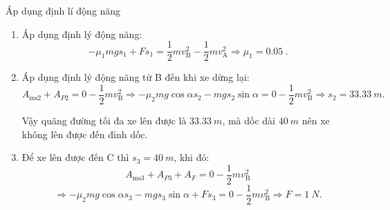 \begin{dang}{Áp dụng định lí động năng}
{		\begin{enumerate}[label=\alph*)]
			\item 
			
			Áp dụng định lý động năng:
			$$-\mu_1 mg s_1 + Fs_1 = \dfrac{1}{2}mv_\text{B}^2 - \dfrac{1}{2}mv_\text{A}^2 \Rightarrow \mu_1 = \SI{0.05}{}.$$
			\item 			
			Áp dụng định lý động năng từ B đến khi xe dừng lại:
			$$A_\text{ms2}+A_{P2} = 0 - \dfrac{1}{2}mv_\text{B}^2 \Rightarrow -\mu_2 mg \cos \alpha s_2 - mgs_2 \sin \alpha = 0 - \dfrac{1}{2}mv_\text{B}^2 \Rightarrow s_2 = \SI{33.33}{m}.$$
			
			Vậy quãng đường tối đa xe lên được là $\SI{33.33}{m}$, mà dốc dài $\SI{40}{m}$ nên xe không lên được đến đỉnh dốc.
			\item 			
			Để xe lên được đến C thì $s_3=\SI{40}{m}$, khi đó:
			$$A_\text{ms3}+A_{P3}+A_F = 0 - \dfrac{1}{2}mv_\text{B}^2$$ $$\Rightarrow -\mu_2 mg \cos \alpha s_3 - mgs_3 \sin \alpha +Fs_3= 0 - \dfrac{1}{2}mv_\text{B}^2 \Rightarrow F = \SI{1}{N}.$$
		\end{enumerate}
	}
\end{dang}
